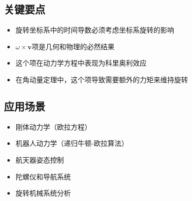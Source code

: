 \documentclass[12pt,a4paper]{article}
\begin{document}
\subsection{关键要点}

\begin{itemize}
\item 旋转坐标系中的时间导数必须考虑坐标系旋转的影响
\item $\omega \times \bm{v}$项是几何和物理的必然结果
\item 这个项在动力学方程中表现为科里奥利效应
\item 在角动量定理中，这个项导致需要额外的力矩来维持旋转
\end{itemize}

\subsection{应用场景}

\begin{itemize}
\item 刚体动力学（欧拉方程）
\item 机器人动力学（递归牛顿-欧拉算法）
\item 航天器姿态控制
\item 陀螺仪和导航系统
\item 旋转机械系统分析
\end{itemize}
\end{document}
